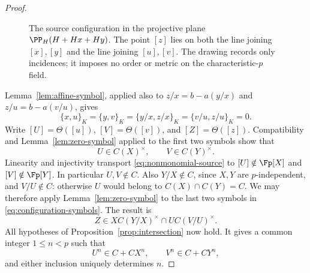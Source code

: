 \begin{proof}
\begin{figure}[htbp]
\centering
{}
\caption{The source configuration in the projective plane
$\PP_H(H+Hx+Hy)$.  The point $[z]$ lies on both the line joining
$[x],[y]$ and the line joining $[u],[v]$.  The drawing records only
incidences; it imposes no order or metric on the characteristic-$p$
field.}
\label{fig:affine-configuration}
\end{figure}

Lemma~\ref{lem:affine-symbol}, applied also to
$z/x=b-a(y/x)$ and $z/u=b-a(v/u)$, gives
\begin{equation}\label{eq:configuration-symbols}
 \{x,u\}_K=\{y,v\}_K
 =\{y/x,z/x\}_K=\{v/u,z/u\}_K=0.
\end{equation}
Write $[U]=\Theta([u])$, $[V]=\Theta([v])$, and
$[Z]=\Theta([z])$.  Compatibility and
Lemma~\ref{lem:zero-symbol} applied to the first two symbols show that
\[
 U\in C(X)^\times,\qquad V\in C(Y)^\times.
\]
Linearity and injectivity transport \eqref{eq:nonmonomial-source} to
$[U]\notin\Fp[X]$ and $[V]\notin\Fp[Y]$.
In particular $U,V\notin C$.  Also $Y/X\notin C$, since $X,Y$ are
$p$-independent, and $V/U\notin C$: otherwise $U$ would belong to
$C(X)\cap C(Y)=C$.  We may therefore apply
Lemma~\ref{lem:zero-symbol} to the last two symbols in
\eqref{eq:configuration-symbols}.  The result is
\[
 Z\in X C(Y/X)^\times\cap U C(V/U)^\times.
\]
All hypotheses of Proposition~\ref{prop:intersection} now hold.  It
gives a common integer $1\le n<p$ such that
\begin{equation}\label{eq:local-line-powers}
 U^n\in C+C X^n,\qquad V^n\in C+C Y^n,
\end{equation}
and either inclusion uniquely determines $n$.


\end{proof}

